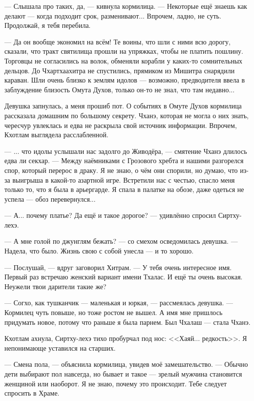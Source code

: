 --- Слышала про таких, да, --- кивнула кормилица.
--- Некоторые ещё знаешь как делают --- когда подходит срок, разменивают...
Впрочем, ладно, не суть.
Продолжай, я тебя перебила.

--- Да он вообще экономил на всём!
Те воины, что шли с ними всю дорогу, сказали, что тракт святилища прошли на упряжках, чтобы не платить пошлину.
Торговцы не согласились на волок, обменяли корабли у каких-то сомнительных дельцов.
До Чхартхаахитра не спустились, прямиком из Мишитра снарядили караван.
Шли очень близко к землям идолов --- возможно, предводителя ввела в заблуждение близость Омута Духов, только он-то не знал, что там недавно...

Девушка запнулась, а меня прошиб пот.
О событиях в Омуте Духов кормилица рассказала домашним по большому секрету.
Чханэ, которая не могла о них знать, чересчур увлеклась и едва не раскрыла свой источник информации.
Впрочем, Кхотлам выглядела расслабленной.

--- ... что идолы услышали нас задолго до Живодёра, --- смятение Чханэ длилось едва ли секхар.
--- Между наёмниками с Грозового хребта и нашими разгорелся спор, который перерос в драку.
Я не знаю, о чём они спорили, но думаю, что из-за выигрыша в какой-то азартной игре.
Встретили нас с честью, спасло меня только то, что я была в арьергарде.
Я спала в палатке на обозе, даже одеться не успела --- обоз перевернулся...

--- А... почему платье?
Да ещё и такое дорогое? --- удивлённо спросил Сиртху-лехэ.

--- А мне голой по джунглям бежать? --- со смехом осведомилась девушка.
--- Надела, что было.
Жизнь свою с собой унесла --- и то хорошо.

--- Послушай, --- вдруг заговорил Хитрам.
--- У тебя очень интересное имя.
Первый раз встречаю женский вариант имени Тхалас.
И ещё ты очень высокая.
Неужели твои дарители такие же?

--- Согхо, как тушканчик --- маленькая и юркая, --- рассмеялась девушка.
--- Кормилец чуть повыше, но тоже ростом не вышел.
А имя мне пришлось придумать новое, потому что раньше я была парнем.
Был Чхалаш --- стала Чханэ.

Кхотлам ахнула, Сиртху-лехэ тихо пробурчал под нос:
<<Хаяй... редкость>>.
Я непонимающе уставился на старших.

--- Смена пола, --- объяснила кормилица, увидев моё замешательство. ---
Обычно дети выбирают пол навсегда, но бывает и такое --- зрелый мужчина становится женщиной или наоборот.
Я не знаю, почему это происходит.
Тебе следует спросить в Храме.

